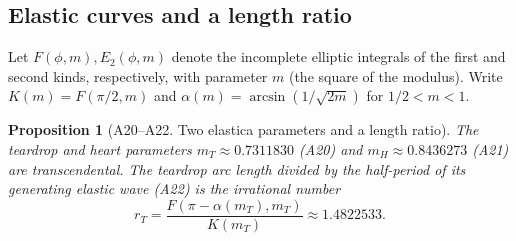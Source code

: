\documentclass[11pt,a4paper]{article}
\newtheorem{proposition}[theorem]{Proposition}
\theoremstyle{definition}
\theoremstyle{remark}
\begin{document}
\subsection{Elastic curves and a length ratio}
Let $F(\phi,m),E_2(\phi,m)$ denote the incomplete elliptic integrals
of the first and second kinds, respectively, with parameter $m$
(the square of the modulus). Write $K(m)=F(\pi/2,m)$ and
$\alpha(m)=\arcsin(1/\sqrt{2m})$ for $1/2<m<1$.
\par\hypertarget{cat-A20}{}\label{page:A20}\hypertarget{cat-A21}{}\label{page:A21}\hypertarget{cat-A22}{}\label{page:A22}
\begin{proposition}[A20--A22. Two elastica parameters and a length ratio]
The teardrop and heart parameters $m_T\approx0.7311830$ (A20)
and $m_H\approx0.8436273$ (A21) are transcendental. The teardrop
arc length divided by the half-period of its generating elastic wave
(A22) is the irrational number
\[
 r_T=\frac{F(\pi-\alpha(m_T),m_T)}{K(m_T)}\approx1.4822533 .
\]
\end{proposition}
\end{document}

